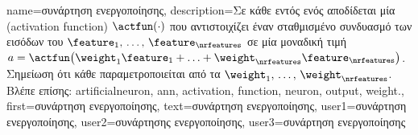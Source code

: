 {name={\foreignlanguage{greek}{συνάρτηση ενεργοποίησης}},
	description={\foreignlanguage{greek}{Σε κάθε}  
		\foreignlanguage{greek}{εντός ενός}  \foreignlanguage{greek}{αποδίδεται μία}   
		(activation function) $\actfun(\cdot)$ \foreignlanguage{greek}{που αντιστοιχίζει έναν σταθμισμένο συνδυασμό των εισόδων του}
		 $\feature_{1}, \,\ldots, \,\feature_{\nrfeatures}$ \foreignlanguage{greek}{σε μία μοναδική τιμή} 
		$a = \actfun\big(\weight_{1} \feature_{1}+\ldots+\weight_{\nrfeatures} \feature_{\nrfeatures} \big)$. 
		\foreignlanguage{greek}{Ση\-μεί\-ωση ότι κάθε}  \foreignlanguage{greek}{παραμετροποιείται από τα} 
		 $\weight_{1}, \,\ldots, \,\weight_{\nrfeatures}$.
		\\
		\foreignlanguage{greek}{Βλέπε επίσης:} \gls{artificialneuron}, \gls{ann}, \gls{activation}, \gls{function}, \gls{neuron}, \gls{output}, \gls{weight}.},
	first={\foreignlanguage{greek}{συνάρτηση ενεργοποίησης}},
	text={\foreignlanguage{greek}{συνάρτηση ενεργοποίησης}},
	user1={\foreignlanguage{greek}{συνάρτηση ενεργοποίησης}}, %
	user2={\foreignlanguage{greek}{συνάρτησης ενεργοποίησης}}, %
	user3={\foreignlanguage{greek}{συνάρτηση ενεργοποίησης}} %
}

